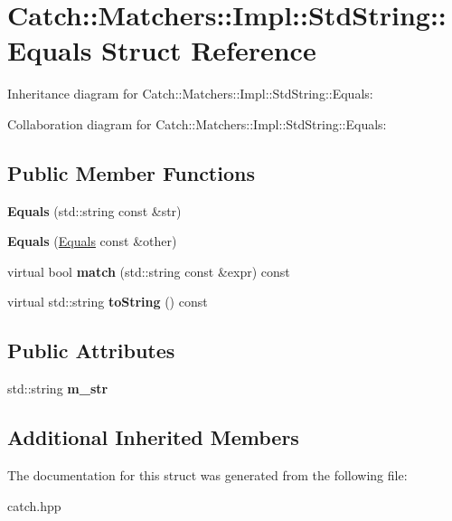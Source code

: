 \hypertarget{struct_catch_1_1_matchers_1_1_impl_1_1_std_string_1_1_equals}{}\section{Catch\+:\+:Matchers\+:\+:Impl\+:\+:Std\+String\+:\+:Equals Struct Reference}
\label{struct_catch_1_1_matchers_1_1_impl_1_1_std_string_1_1_equals}


Inheritance diagram for Catch\+:\+:Matchers\+:\+:Impl\+:\+:Std\+String\+:\+:Equals\+:


Collaboration diagram for Catch\+:\+:Matchers\+:\+:Impl\+:\+:Std\+String\+:\+:Equals\+:
\subsection*{Public Member Functions}
\begin{DoxyCompactItemize}
\item 
\mbox{\label{struct_catch_1_1_matchers_1_1_impl_1_1_std_string_1_1_equals_a1bd99b381c6116a02b1e3ca200ca920c}} 
{\bfseries Equals} (std\+::string const \&str)
\item 
\mbox{\label{struct_catch_1_1_matchers_1_1_impl_1_1_std_string_1_1_equals_acaa97de06aedf363ae803d65a975f5e4}} 
{\bfseries Equals} (\hyperlink{struct_catch_1_1_matchers_1_1_impl_1_1_std_string_1_1_equals}{Equals} const \&other)
\item 
\mbox{\label{struct_catch_1_1_matchers_1_1_impl_1_1_std_string_1_1_equals_abf0a94b4e66dbd586268d9983f867e68}} 
virtual bool {\bfseries match} (std\+::string const \&expr) const
\item 
\mbox{\label{struct_catch_1_1_matchers_1_1_impl_1_1_std_string_1_1_equals_ab0d73961b95d9836d77b9e2e94c3790b}} 
virtual std\+::string {\bfseries to\+String} () const
\end{DoxyCompactItemize}
\subsection*{Public Attributes}
\begin{DoxyCompactItemize}
\item 
\mbox{\label{struct_catch_1_1_matchers_1_1_impl_1_1_std_string_1_1_equals_a41fc4413185f47d8b6d8da7a55078921}} 
std\+::string {\bfseries m\+\_\+str}
\end{DoxyCompactItemize}
\subsection*{Additional Inherited Members}


The documentation for this struct was generated from the following file\+:\begin{DoxyCompactItemize}
\item 
catch.\+hpp\end{DoxyCompactItemize}
